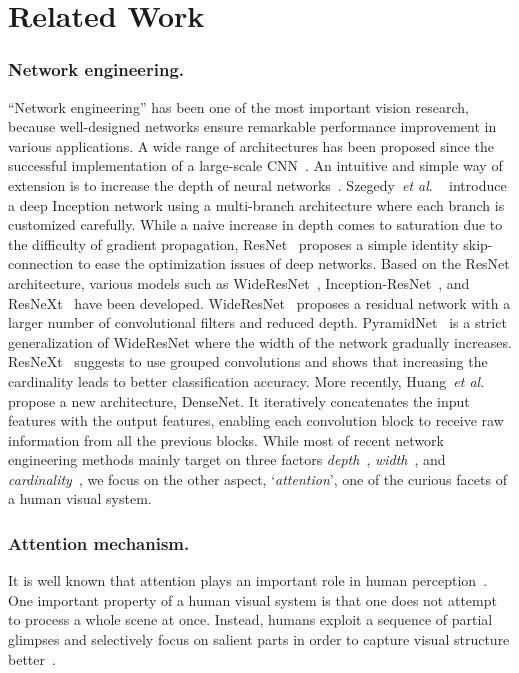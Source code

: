 \documentclass[runningheads]{llncs}
\newcommand{\etal}{\textit{et al}. }
\begin{document}
\section{Related Work}\label{sec:related}

\subsubsection{Network engineering.} 
``Network engineering'' has been one of the most important vision research, because well-designed networks ensure remarkable performance improvement in various applications. A wide range of architectures has been proposed since the successful implementation of a large-scale CNN~\cite{krizhevsky2012imagenet}. An intuitive and simple way of extension is to increase the depth of neural networks~\cite{simonyan2014very}. Szegedy~\etal~\cite{szegedy2015going} introduce a deep Inception network using a multi-branch architecture where each branch is customized carefully. While a naive increase in depth comes to saturation due to the difficulty of gradient propagation, ResNet~\cite{he2016deep} proposes a simple identity skip-connection to ease the optimization issues of deep networks. Based on the ResNet architecture, various models such as WideResNet~\cite{zagoruyko2016wide}, Inception-ResNet~\cite{szegedy2017v4}, and ResNeXt~\cite{xie2016aggregated} have been developed. WideResNet~\cite{zagoruyko2016wide} proposes a residual network with a larger number of convolutional filters and reduced depth. PyramidNet~\cite{han2016deep} is a strict generalization of WideResNet where the width of the network gradually increases. ResNeXt~\cite{xie2016aggregated} suggests to use grouped convolutions and shows that increasing the cardinality leads to better classification accuracy. More recently, Huang~\etal~\cite{huang2016densely} propose a new architecture, DenseNet. It iteratively concatenates the input features with the output features, enabling each convolution block to receive raw information from all the previous blocks. While most of recent network engineering methods mainly target on three factors \textit{depth}~\cite{krizhevsky2012imagenet,simonyan2014very,szegedy2015going,he2016deep}, \textit{width}~\cite{szegedy2015going,szegedy2016rethinking,zagoruyko2016wide,szegedy2017v4}, and \textit{cardinality}~\cite{xie2016aggregated,chollet2016xception}, we focus on the other aspect, `\textit{attention}', one of the curious facets of a human visual system.

\subsubsection{Attention mechanism.}
It is well known that attention plays an important role in human perception~\cite{Itti1998saliency,rensink2000dynamic,corbetta2002control}. One important property of a human visual system is that one does not attempt to process a whole scene at once. Instead, humans exploit a sequence of partial glimpses and selectively focus on salient parts in order to capture visual structure better~\cite{larochelle2010learning}. 
\end{document}
